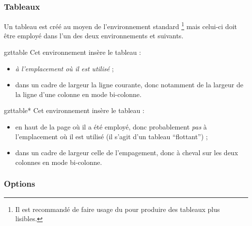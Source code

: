 \subsubsection{Tableaux}
\label{sec-tableaux}

Un tableau est créé au moyen de l'environnement standard
\footnote{Il est recommandé de faire usage du
   pour produire des tableaux plus lisibles.} mais celui-ci
doit être employé dans l'un des deux environnements  et
 suivants.

\begin{docEnvironment}[doclang/environment content=tableau créé avec \docAuxEnvironment{tabular}]{gzttable}{}
  Cet environnement insère le tableau :
  \begin{itemize}
  \item \emph{à l'emplacement où il est utilisé} ;
  \item dans un cadre de largeur la ligne courante, donc notamment de la largeur
    de la ligne d'une colonne en mode bi-colonne.
  \end{itemize}
\end{docEnvironment}

\begin{docEnvironment}[doclang/environment content=tableau créé avec \docAuxEnvironment{tabular}]{gzttable*}{}
  Cet environnement insère le tableau :
  \begin{itemize}
  \item en haut de la page où il a été employé, donc probablement \emph{pas}
    à l'emplacement où il est utilisé (il s'agit d'un tableau
    \enquote{flottant}) ;
  \item dans un cadre de largeur celle de l'empagement, donc à cheval sur les
    deux colonnes en mode bi-colonne.
  \end{itemize}
\end{docEnvironment}

\subsubsection{Options}
\label{sec-options-gzt}

